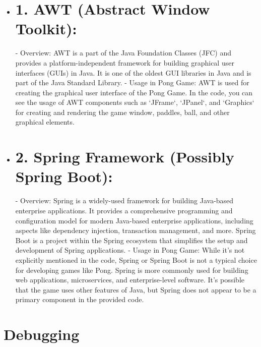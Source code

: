 \documentclass[16pt]{article}
\begin{document}
\begin{itemize}
    \item \section*{1. AWT (Abstract Window Toolkit):}
    \begin{flushleft}
     \Large   - Overview: AWT is a part of the Java Foundation Classes (JFC) and provides a  \Large  platform-independent framework for building graphical user interfaces (GUIs) in  \Large  Java. It is one of the oldest GUI libraries in Java and is part of the Java  \Large  Standard Library.
     \Large      - Usage in Pong Game: AWT is used for creating the graphical user interface  \Large  of the Pong Game. In the code, you can see the usage of AWT components such as  \Large  `JFrame`, `JPanel`, and `Graphics` for creating and rendering the game window,  \Large  paddles, ball, and other graphical elements.
    \end{flushleft}
    \item \section*{2. Spring Framework (Possibly Spring Boot):}
    \begin{flushleft}
      \Large     - Overview: Spring is a widely-used framework for building Java-based  \Large  enterprise applications. It provides a comprehensive programming and configuration  \Large  model for modern Java-based enterprise applications, including aspects like  \Large  dependency injection, transaction management, and more. Spring Boot is a project  \Large  within the Spring ecosystem that simplifies the setup and development of Spring  \Large  applications.
       \Large    - Usage in Pong Game: While it's not explicitly mentioned in the code, Spring  \Large  or Spring Boot is not a typical choice for developing games like Pong. Spring  \Large  is more commonly used for building web applications, microservices, and  \Large   \Large  enterprise-level software. It's possible that the game uses other features of  \Large  Java, but Spring does not appear to be a primary component in the provided code.
    \end{flushleft}
\end{itemize}
\newpage

\section*{Debugging}
\end{document}
